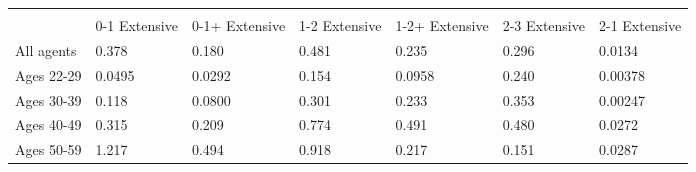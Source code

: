 \begin{tabular}{p{1.5cm}p{1.2cm}p{1.2cm}p{1.2cm}p{1.2cm}p{1.2cm}p{1.2cm}}
\hline\hline
            &\multicolumn{6}{c}{}                                                         \\
            &0-1 Extensive&0-1+ Extensive&1-2 Extensive&1-2+ Extensive&2-3 Extensive&2-1 Extensive\\
\hline
All agents  &       0.378&       0.180&       0.481&       0.235&       0.296&      0.0134\\
Ages 22-29  &      0.0495&      0.0292&       0.154&      0.0958&       0.240&     0.00378\\
Ages 30-39  &       0.118&      0.0800&       0.301&       0.233&       0.353&     0.00247\\
Ages 40-49  &       0.315&       0.209&       0.774&       0.491&       0.480&      0.0272\\
Ages 50-59  &       1.217&       0.494&       0.918&       0.217&       0.151&      0.0287\\
\hline\hline
\end{tabular}
